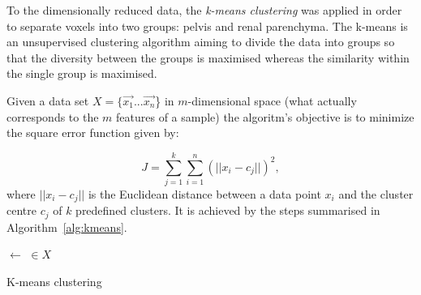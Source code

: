 To the dimensionally reduced data, the \textit{k-means clustering} \cite{kmeans} was applied in order to separate voxels into two groups: pelvis and renal parenchyma. 
The k-means is an unsupervised clustering algorithm aiming to divide the data into groups so that the diversity between the groups is maximised whereas the similarity within the single group is maximised. 

Given a data set $X=\{ \vec{x_1}...\vec{x_n}$\} in $m$-dimensional space (what actually corresponds to the $m$ features of a sample) the algoritm's objective is to minimize the square error function given by:

\begin{equation}
	\label{eq:kmeans}
	J = \sum_{j=1}^{k}\sum_{i=1}^{n}(||x_i-c_j||)^2,
\end{equation}
where $||x_i-c_j||$ is  the Euclidean distance between a data point $x_i$ and the cluster centre $c_j$ of $k$ predefined clusters. It is achieved by the steps summarised in Algorithm~\ref{alg:kmeans}.

\vspace{16pt}
\begin{algorithm}[H]
\footnotesize
    
	
    
    \BlankLine
    \BlankLine
    
    
	\DontPrintSemicolon
	\Centroids $\leftarrow$  \Centroids$\in X$\;
    
	  
    
    
    \caption{K-means clustering}
    \label{alg:kmeans}
\end{algorithm}

